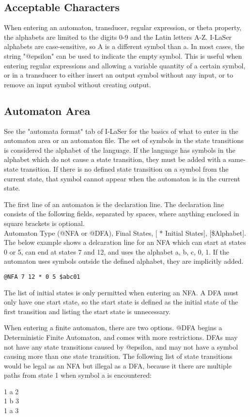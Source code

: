 \documentclass{article}
\begin{document}
\subsection{Acceptable Characters}
When entering an automaton, transducer, regular expression, or theta property, the alphabets are limited to the digits 0-9 and the Latin letters A-Z.
I-LaSer alphabets are case-sensitive, so A is a different symbol than a.
In most cases, the string "@epsilon" can be used to indicate the empty symbol.
This is useful when entering regular expressions and allowing a variable quantity of a certain symbol, or in a transducer to either insert an output symbol without any input, or to remove an input symbol without creating output.

\subsection{Automaton Area}
See the "automata format" tab of I-LaSer for the basics of what to enter in the automaton area or an automaton file. The set of symbols in the state transitions is considered the alphabet of the language. If the language has symbols in the alphabet which do not cause a state transition, they must be added with a same-state transition. If there is no defined state transition on a symbol from the current state, that symbol cannot appear when the automaton is in the current state.
\par The first line of an automaton is the declaration line. The declaration line consists of the following fields, separated by spaces, where anything enclosed in square brackets is optional.\\
Automaton Type (@NFA or @DFA), Final States, [ * Initial States], [\$Alphabet].
The below example shows a delcaration line for an NFA which can start at states 0 or 5, can end at states 7 and 12, and uses the alphabet {a, b, c, 0, 1}.
If the automaton uses symbols outside the defined alphabet, they are implicitly added. 
\begin{center}
\verb-@NFA 7 12 * 0 5 $abc01-
\end{center}
The list of initial states is only permitted when entering an NFA.
A DFA must only have one start state, so the start state is defined as the initial state of the first transition and listing the start state is unnecessary. 

\par When entering a finite automaton, there are two options.
@DFA begins a Deterministic Finite Automaton, and comes with more restrictions.
DFAs may not have any state transitions caused by @epsilon, and may not have a symbol causing more than one state transition.
The following list of state transitions would be legal as an NFA but illegal as a DFA, because it there are multiple paths from state 1 when symbol a is encountered:
\begin{center}
1 a 2\\
1 b 3\\
1 a 3\\
\end{center}
\end{document}
